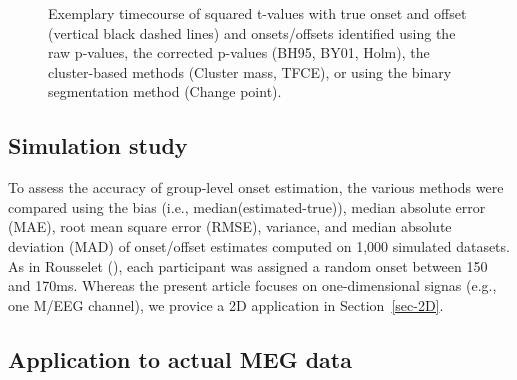 \documentclass[
  doc,
  floatsintext,
  longtable,
  a4paper,
  nolmodern,
  notxfonts,
  notimes,
  donotrepeattitle,
  colorlinks=true,linkcolor=blue,citecolor=blue,urlcolor=blue]{apa7}
\begin{document}
\begin{figure}[!htb]

\caption{\label{fig-corrections}Exemplary timecourse of squared t-values
with true onset and offset (vertical black dashed lines) and
onsets/offsets identified using the raw p-values, the corrected p-values
(BH95, BY01, Holm), the cluster-based methods (Cluster mass, TFCE), or
using the binary segmentation method (Change point).}


\end{figure}%

\newpage

\subsection{Simulation study}\label{simulation-study}

To assess the accuracy of group-level onset estimation, the various
methods were compared using the bias (i.e., median(estimated-true)),
median absolute error (MAE), root mean square error (RMSE), variance,
and median absolute deviation (MAD) of onset/offset estimates computed
on 1,000 simulated datasets. As in Rousselet
(), each participant was
assigned a random onset between 150 and 170ms. Whereas the present
article focuses on one-dimensional signas (e.g., one M/EEG channel), we
provice a 2D application in Section~\ref{sec-2D}.

\subsection{Application to actual MEG
data}\label{application-to-actual-meg-data}
\end{document}
